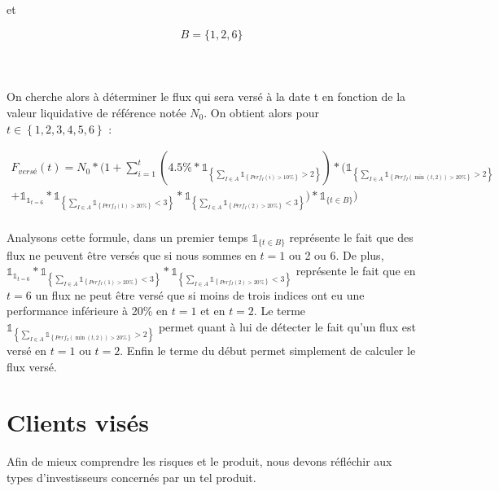 \documentclass[french,12pt,a4paper]{article}
\begin{document}
\noindent et

\[ B = \{1,2,6\} \]\\
\\
\\
On cherche alors à déterminer le flux qui sera versé à la date t en fonction de la valeur liquidative de référence notée $N_{0}$.
On obtient alors pour $t \in \left\lbrace 1,2,3,4,5,6 \right\rbrace$ :

\begin{multline*}

  F_{versé}(t) = N_{0}*(1+ \sum_{i=1}^{t}(4.5\%*\mathds{1}_{\left\lbrace \sum_{I \in A} \mathds{1}_{\left\lbrace Perf_{I}(i)>10\% \right\rbrace}>2 \right\rbrace}) * (\mathds{1}_{\left\lbrace \sum_{I \in A} \mathds{1}_{\left\lbrace Perf_{I}(\min{(t,2)})>20\% \right\rbrace}>2 \right\rbrace}\\ 
  + \mathds{1}_{\mathds{1}_{t=6}}*\mathds{1}_{\left\lbrace \sum_{I \in A} \mathds{1}_{\left\lbrace Perf_{I}(1)>20\% \right\rbrace}<3 \right\rbrace}*\mathds{1}_{\left\lbrace \sum_{I \in A} \mathds{1}_{\left\lbrace Perf_{I}(2)>20\% \right\rbrace}<3 \right\rbrace})*\mathds{1}_{\{t \in B\}}) \\
  
\end{multline*}

Analysons cette formule, dans un premier temps $\mathds{1}_{\{t \in B\}}$ représente le fait que des flux ne peuvent être versés que si nous sommes en $t=1$ ou 2 ou 6. De plus, $\mathds{1}_{\mathds{1}_{t=6}}*\mathds{1}_{\left\lbrace \sum_{I \in A} \mathds{1}_{\left\lbrace Perf_{I}(1)>20\% \right\rbrace}<3 \right\rbrace}*\mathds{1}_{\left\lbrace \sum_{I \in A} \mathds{1}_{\left\lbrace Perf_{I}(2)>20\% \right\rbrace}<3 \right\rbrace}$ représente le fait que en $t=6$ un flux ne peut être versé que si moins de trois indices ont eu une performance inférieure à 20\% en $t=1$ et en $t=2$. Le terme $\mathds{1}_{\left\lbrace \sum_{I \in A} \mathds{1}_{\left\lbrace Perf_{I}(\min{(t,2)})>20\% \right\rbrace}>2 \right\rbrace}$ permet quant à lui de détecter le fait qu'un flux est versé en $t=1$ ou $t=2$. Enfin le terme du début permet simplement de calculer le flux versé. 

\section{Clients visés}

Afin de mieux comprendre les risques et le produit, nous devons réfléchir aux types d'investisseurs concernés par un tel produit.\\
\end{document}
